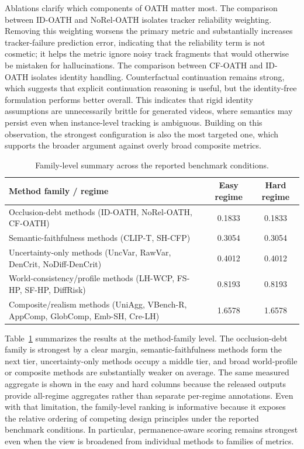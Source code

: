 \documentclass{article}
\begin{document}
Ablations clarify which components of OATH matter most. The comparison between ID-OATH and NoRel-OATH isolates tracker reliability weighting. Removing this weighting worsens the primary metric and substantially increases tracker-failure prediction error, indicating that the reliability term is not cosmetic; it helps the metric ignore noisy track fragments that would otherwise be mistaken for hallucinations. The comparison between CF-OATH and ID-OATH isolates identity handling. Counterfactual continuation remains strong, which suggests that explicit continuation reasoning is useful, but the identity-free formulation performs better overall. This indicates that rigid identity assumptions are unnecessarily brittle for generated videos, where semantics may persist even when instance-level tracking is ambiguous. Building on this observation, the strongest configuration is also the most targeted one, which supports the broader argument against overly broad composite metrics.

\begin{table}[htbp]
    \centering
    \caption{Family-level summary across the reported benchmark conditions.}
    \label{tab:family_summary}
    \begin{tabular}{lcc}
        \toprule
        Method family / regime & Easy regime & Hard regime \\
        \midrule
        Occlusion-debt methods (ID-OATH, NoRel-OATH, CF-OATH) & 0.1833 & 0.1833 \\
        Semantic-faithfulness methods (CLIP-T, SH-CFP) & 0.3054 & 0.3054 \\
        Uncertainty-only methods (UncVar, RawVar, DenCrit, NoDiff-DenCrit) & 0.4012 & 0.4012 \\
        World-consistency/profile methods (LH-WCP, FS-HP, SF-HP, DiffRisk) & 0.8193 & 0.8193 \\
        Composite/realism methods (UniAgg, VBench-R, AppComp, GlobComp, Emb-SH, Cre-LH) & 1.6578 & 1.6578 \\
        \bottomrule
    \end{tabular}
\end{table}

Table~\ref{tab:family_summary} summarizes the results at the method-family level. The occlusion-debt family is strongest by a clear margin, semantic-faithfulness methods form the next tier, uncertainty-only methods occupy a middle tier, and broad world-profile or composite methods are substantially weaker on average. The same measured aggregate is shown in the easy and hard columns because the released outputs provide all-regime aggregates rather than separate per-regime annotations. Even with that limitation, the family-level ranking is informative because it exposes the relative ordering of competing design principles under the reported benchmark conditions. In particular, permanence-aware scoring remains strongest even when the view is broadened from individual methods to families of metrics.
\end{document}
